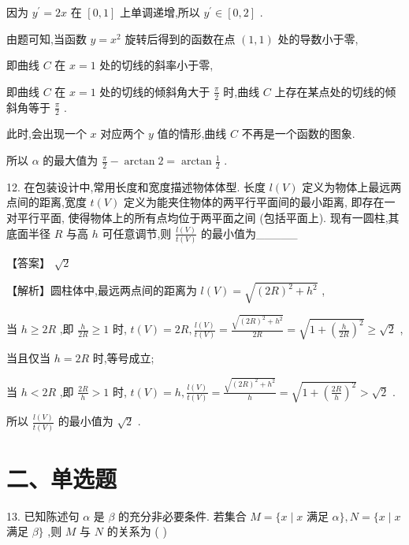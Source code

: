 \documentclass[10pt]{article}
\begin{document}
因为 \({y}^{\prime } = {2x}\) 在 \(\left\lbrack  {0,1}\right\rbrack\) 上单调递增,所以 \({y}^{\prime } \in  \left\lbrack  {0,2}\right\rbrack\) .

由题可知,当函数 \(y = {x}^{2}\) 旋转后得到的函数在点 \(\left( {1,1}\right)\) 处的导数小于零,

即曲线 \(C\) 在 \(x = 1\) 处的切线的斜率小于零,

即曲线 \(C\) 在 \(x = 1\) 处的切线的倾斜角大于 \(\frac{\pi }{2}\) 时,曲线 \(C\) 上存在某点处的切线的倾斜角等于 \(\frac{\pi }{2}\) .

此时,会出现一个 \(x\) 对应两个 \(y\) 值的情形,曲线 \(C\) 不再是一个函数的图象.

所以 \(\alpha\) 的最大值为 \(\frac{\pi }{2} - \arctan 2 = \arctan \frac{1}{2}\) .

12. 在包装设计中,常用长度和宽度描述物体体型. 长度 \(l\left( V\right)\) 定义为物体上最远两点间的距离,宽度 \(t\left( V\right)\) 定义为能夹住物体的两平行平面间的最小距离, 即存在一对平行平面, 使得物体上的所有点均位于两平面之间 (包括平面上). 现有一圆柱,其底面半径 \(R\) 与高 \(h\) 可任意调节,则 \(\frac{l\left( V\right) }{t\left( V\right) }\) 的最小值为\_\_\_\_\_

【答案】 \(\sqrt{2}\)

【解析】圆柱体中,最远两点间的距离为 \(l\left( V\right)  = \sqrt{{\left( 2R\right) }^{2} + {h}^{2}}\) ,

当 \(h \geq  {2R}\) ,即 \(\frac{h}{2R} \geq  1\) 时, \(t\left( V\right)  = {2R},\frac{l\left( V\right) }{t\left( V\right) } = \frac{\sqrt{{\left( 2R\right) }^{2} + {h}^{2}}}{2R} = \sqrt{1 + {\left( \frac{h}{2R}\right) }^{2}} \geq  \sqrt{2}\) ,

当且仅当 \(h = {2R}\) 时,等号成立;

当 \(h < {2R}\) ,即 \(\frac{2R}{h} > 1\) 时, \(t\left( V\right)  = h,\frac{l\left( V\right) }{t\left( V\right) } = \frac{\sqrt{{\left( 2R\right) }^{2} + {h}^{2}}}{h} = \sqrt{1 + {\left( \frac{2R}{h}\right) }^{2}} > \sqrt{2}\) .

所以 \(\frac{l\left( V\right) }{t\left( V\right) }\) 的最小值为 \(\sqrt{2}\) .

\section*{二、单选题}

13. 已知陈述句 \(\alpha\) 是 \(\beta\) 的充分非必要条件. 若集合 \(M = \{ x \mid  x\) 满足 \(\alpha \} ,N = \{ x \mid  x\) 满足 \(\beta \}\) ,则 \(M\) 与 \(N\) 的关系为 ( )
\end{document}

